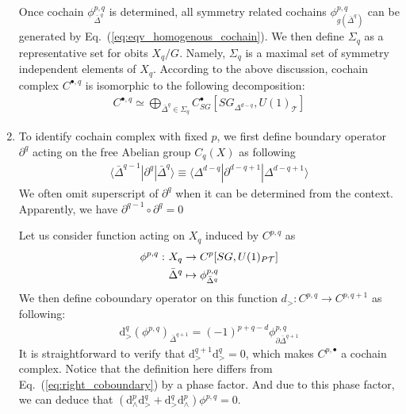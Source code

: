 \documentclass[reprint,amsmath,amssymb,aps,pra,]{revtex4-1}
\newcommand{\dd}{\mathrm{d}} %
\newcommand{\TT}{\mathcal{T}} %
\begin{document}
\begin{enumerate}
    Once cochain $\phi^{p,q}_{\bar{\Delta}^q}$ is determined, all symmetry related cochains $\phi^{p,q}_{g(\bar{\Delta}^q)}$ can be generated by Eq.~(\ref{eq:eqv_homogenous_cochain}).
    We then define $\Sigma_q$ as a representative set for obits $X_q/G$.
    Namely, $\Sigma_q$ is a maximal set of symmetry independent elements of $X_q$.  
    According to the above discussion, cochain complex $C^{\bullet,q}$ is isomorphic to the following decomposition:
    \begin{align}
      C^{\bullet,q}\simeq \bigoplus_{\bar{\Delta}^q\in \Sigma_q}C^\bullet_{SG}[SG_{\Delta^{d-q}},U(1)_\TT]
      \label{}
    \end{align}
  \item To identify cochain complex with fixed $p$, we first define boundary operator $\partial^q$ acting on the free Abelian group $C_q(X)$ as following
    \begin{align}
      \langle \bar{\Delta}^{q-1}|\partial^q|\bar{\Delta}^q\rangle\equiv\langle\Delta^{d-q}|\partial^{d-q+1}|\Delta^{d-q+1}\rangle
      \label{}
    \end{align}
    We often omit superscript of $\partial^q$ when it can be determined from the context.
    Apparently, we have $\partial^{q-1}\circ\partial^q=0$

    Let us consider function acting on $X_q$ induced by $C^{p,q}$ as
    \begin{align}
      \phi^{p,q}:~& X_q\rightarrow C^p[SG,U(1)_{P\TT}]\notag\\
      &\bar{\Delta}^q\mapsto\phi^{p,q}_{\bar{\Delta}^q}
      \label{}
    \end{align}
    We then define coboundary operator on this function $d_>:C^{p,q}\rightarrow C^{p,q+1}$ as following:
    \begin{align}
      \dd_>^q\left(\phi^{p,q}\right)_{\bar{\Delta}^{q+1}}=(-1)^{p+q-d}\phi^{p,q}_{\partial\bar{\Delta}^{q+1}}
    \end{align}
    It is straightforward to verify that $\dd_>^{q+1}\dd_>^{q}=0$, which makes $C^{p,\bullet}$ a cochain complex. 
    Notice that the definition here differs from Eq.~(\ref{eq:right_coboundary}) by a phase factor.
    And due to this phase factor, we can deduce that $(\dd_\wedge^p\dd_>^q+\dd_>^q\dd_\wedge^p)\phi^{p,q}=0$.
\end{enumerate}
\end{document}
